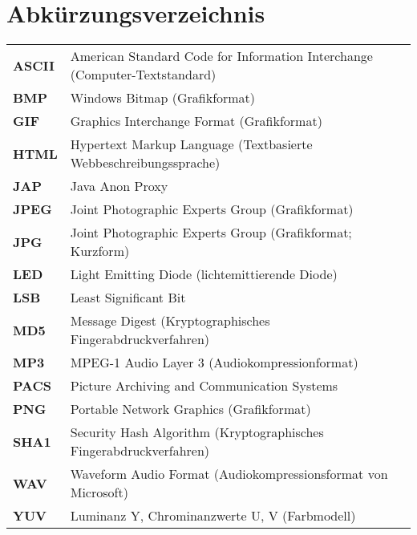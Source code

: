 {}
\chapter*{Abkürzungsverzeichnis}

\begin{center}
\begin{tabular}{ll}

\textbf{ASCII}&	American Standard Code for Information Interchange (Computer-Textstandard)\\
\textbf{BMP}	&	Windows Bitmap (Grafikformat)\\
\textbf{GIF}	&	Graphics Interchange Format (Grafikformat)\\
\textbf{HTML}	&	Hypertext Markup Language (Textbasierte Webbeschreibungssprache)\\
\textbf{JAP}	&	Java Anon Proxy\\
\textbf{JPEG}	&	Joint Photographic Experts Group (Grafikformat)\\
\textbf{JPG}	&	Joint Photographic Experts Group (Grafikformat; Kurzform)\\
\textbf{LED}	&	Light Emitting Diode (lichtemittierende Diode)\\
\textbf{LSB}	&	Least Significant Bit\\
\textbf{MD5}	& Message Digest (Kryptographisches Fingerabdruckverfahren)\\
\textbf{MP3}	&	MPEG-1 Audio Layer 3 (Audiokompressionformat)\\
\textbf{PACS}	&	Picture Archiving and Communication Systems\\
\textbf{PNG}	&	Portable Network Graphics (Grafikformat)\\
\textbf{SHA1}	&	Security Hash Algorithm (Kryptographisches Fingerabdruckverfahren)\\
\textbf{WAV}	&	Waveform Audio Format (Audiokompressionsformat von Microsoft)\\
\textbf{YUV}	&	Luminanz Y, Chrominanzwerte U, V (Farbmodell)\\



\end{tabular}
\end{center}














